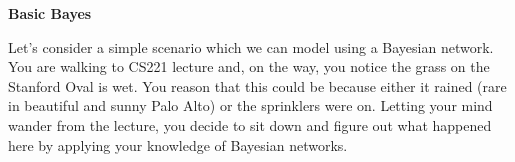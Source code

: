 \item {\bf Basic Bayes}

Let's consider a simple scenario which we can model using a Bayesian network. You are walking to CS221 lecture and, on the way, you notice the grass on the Stanford Oval is wet. You reason that this could be because either it rained (rare in beautiful and sunny Palo Alto) or the sprinklers were on. Letting your mind wander from the lecture, you decide to sit down and figure out what happened here by applying your knowledge of Bayesian networks.

\begin{enumerate}

  

  

  

  

  

\end{enumerate}
